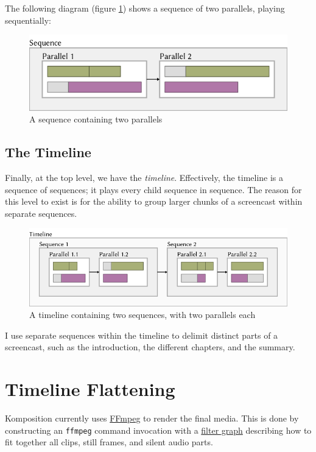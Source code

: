 The following diagram (figure \ref{fig:case1_4}) shows a sequence of two parallels, playing sequentially:
\begin{figure}[htbp]
 \centering
 \includegraphics[width=.95\linewidth]{./pics/case1_4.png}
 \caption{A sequence containing two parallels}
 \label{fig:case1_4}
\end{figure}

\subsection{The Timeline}

Finally, at the top level, we have the \textit{timeline}. Effectively, the timeline is a sequence of sequences; it plays every child sequence in sequence. The reason for this level to exist is for the ability to group larger chunks of a screencast within separate sequences.
\begin{figure}[htbp]
 \centering
 \includegraphics[width=.95\linewidth]{./pics/case1_5.png}
 \caption{A timeline containing two sequences, with two parallels each}
 \label{fig:case1_5}
\end{figure}
I use separate sequences within the timeline to delimit distinct parts of a screencast, such as the introduction, the different chapters, and the summary.


\section{Timeline Flattening}

Komposition currently uses \href{https://ffmpeg.org/}{FFmpeg} to render the final media. This is done by constructing an \texttt{ffmpeg} command invocation with a \href{https://ffmpeg.org/ffmpeg-filters.html}{filter graph} describing how to fit together all clips, still frames, and silent audio parts.

